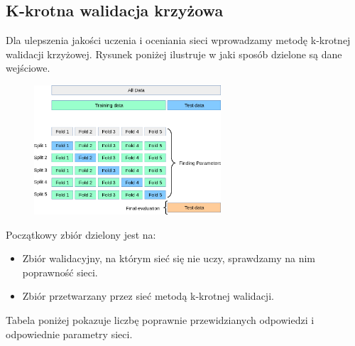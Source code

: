 \documentclass[12pt,a4paper]{article}
\begin{document}
\subsection{K-krotna walidacja krzyżowa}

Dla ulepszenia jakości uczenia i oceniania sieci wprowadzamy metodę k-krotnej walidacji krzyżowej. Rysunek poniżej ilustruje w jaki sposób dzielone są dane wejściowe.

\begin{figure}[h]
  \centering
  \includegraphics[width=0.62\textwidth]{charts/grid_search_cross_validation.png}
  \caption{}
  \label{}
\end{figure}

Początkowy zbiór dzielony jest na:

\begin{itemize}
  \item   Zbiór walidacyjny, na którym sieć się nie uczy, sprawdzamy na nim poprawność sieci.
  \item   Zbiór przetwarzany przez sieć metodą k-krotnej walidacji.
\end{itemize}

Tabela poniżej pokazuje liczbę poprawnie przewidzianych odpowiedzi i odpowiednie parametry sieci.
 
\end{document}
